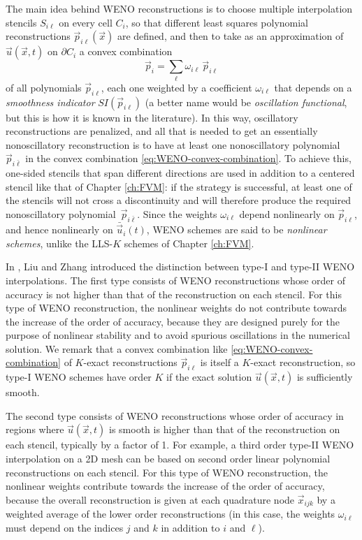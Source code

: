 The main idea behind WENO reconstructions is to choose multiple
interpolation stencils $S_{i\ell}$ on every cell $C_i$, so that different
least squares polynomial reconstructions $\vec{p}_{i\ell}(\vec{x})$ are defined,
and then to take as an approximation of $\vec{u}(\vec{x},t)$ on $\partial C_i$
a convex combination
\begin{equation} \label{eq:WENO-convex-combination}
\vec{p}_i = \sum_{\ell} \omega_{i\ell} \, \vec{p}_{i\ell}
\end{equation}
of all polynomials $\vec{p}_{i\ell}$, each one weighted by a coefficient
$\omega_{i\ell}$ that depends on a \emph{smoothness indicator}
$S\!I(\vec{p}_{i\ell})$ (a better name would be \emph{oscillation functional},
but this is how it is known in the literature).
In this way, oscillatory reconstructions are penalized, and all that is needed
to get an essentially nonoscillatory reconstruction is to have at least one
nonoscillatory polynomial~$\vec{p}_{i\bar{\ell}}$ in the convex combination
\eqref{eq:WENO-convex-combination}.
To achieve this, one-sided stencils that span different directions are used
in addition to a centered stencil like that of Chapter \ref{ch:FVM}:
if the strategy is successful, at least one of the stencils will not cross
a discontinuity and will therefore produce the required nonoscillatory
polynomial~$\vec{p}_{i\bar{\ell}}$.
Since the weights $\omega_{i\ell}$ depend nonlinearly on $\vec{p}_{i\ell}$,
and hence nonlinearly on $\bar{\vec{u}}_i(t)$, WENO schemes are
said to be \emph{nonlinear schemes}, unlike the LLS-$K$ schemes
of Chapter \ref{ch:FVM}.

In \cite{liu2013robust}, Liu and Zhang introduced the distinction
between type-I and type-II WENO interpolations.
The first type consists of WENO reconstructions whose order of accuracy is
not higher than that of the reconstruction on each stencil.
For this type of WENO reconstruction, the nonlinear weights do not
contribute towards the increase of the order of accuracy, because they are
designed purely for the purpose of nonlinear stability and to avoid
spurious oscillations in the numerical solution.
We remark that a convex combination like \eqref{eq:WENO-convex-combination}
of $K$-exact reconstructions $\vec{p}_{i\ell}$ is itself a $K$-exact
reconstruction, so type-I WENO schemes have order $K$ if the
exact solution $\vec{u}(\vec{x},t)$ is sufficiently smooth.

The second type consists of WENO reconstructions whose order of accuracy in regions
where $\vec{u}(\vec{x},t)$ is smooth is higher than that of the reconstruction
on each stencil, typically by a factor of 1.
For example, a third order type-II WENO interpolation on a 2D mesh can be
based on second order linear polynomial reconstructions on each stencil.
For this type of WENO reconstruction, the nonlinear weights contribute
towards the increase of the order of accuracy, because the overall
reconstruction is given at each quadrature node $\vec{x}_{ijk}$ by a weighted
average of the lower order reconstructions (in this case, the weights
$\omega_{i\ell}$ must depend on the indices $j$ and $k$ in addition to $i$ and $\ell$).

